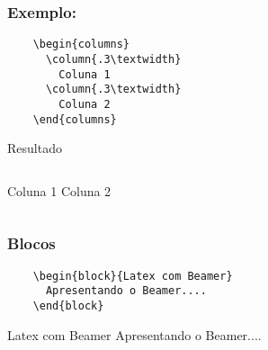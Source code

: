 
\begin{frame}[fragile]
  \frametitle{Exemplo:}

  \begin{verbatim}
    \begin{columns}
      \column{.3\textwidth}
        Coluna 1
      \column{.3\textwidth}
        Coluna 2
    \end{columns}
  \end{verbatim}

  \begin{block}{Resultado}
    \begin{center}
     \begin{columns}
         Coluna 1
        Coluna 2
    \end{columns}
    \end{center}
  \end{block}
\end{frame}


\begin{frame}[fragile]
  \frametitle{Blocos}

  \begin{verbatim}
    \begin{block}{Latex com Beamer}
      Apresentando o Beamer....
    \end{block}
  \end{verbatim}

   \begin{block}{Latex com Beamer}
      Apresentando o Beamer....
   \end{block}

\end{frame}


